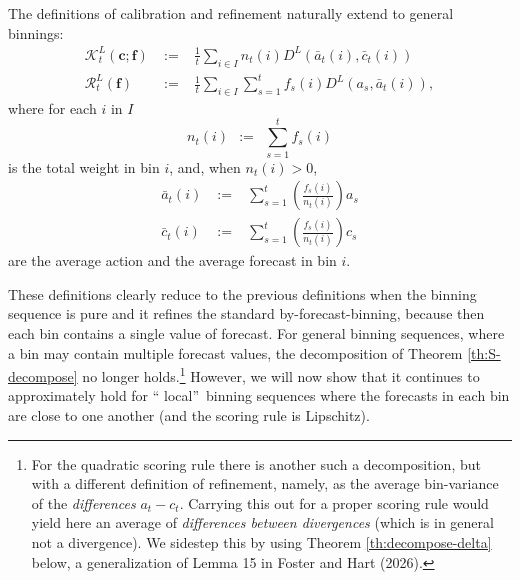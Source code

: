 \documentclass[12pt,a4paper,notitlepage]{article}
\begin{document}
The definitions of calibration and refinement naturally extend to general
binnings:%
\begin{eqnarray*}
\mathcal{K}_{t}^{L}(\mathbf{c};\mathbf{f}) &%
{\;:=\;}%
&\frac{1}{t}\sum_{i\in I}n_{t}(i)D^{L}(\bar{a}_{t}(i),\bar{c}_{t}(i)) \\
\mathcal{R}_{t}^{L}(\mathbf{f}) &%
{\;:=\;}%
&\frac{1}{t}\sum_{i\in I}\sum_{s=1}^{t}f_{s}(i)D^{L}(a_{s},\bar{a}_{t}(i)),
\end{eqnarray*}%
where for each $i$ in $I$%
\begin{equation*}
n_{t}(i)\,%
{\;:=\;}%
\,\sum_{s=1}^{t}f_{s}(i)
\end{equation*}%
is the total weight in bin $i$, and, when $n_{t}(i)>0$,%
\begin{eqnarray*}
\bar{a}_{t}(i) &%
{\;:=\;}%
&\sum_{s=1}^{t}\left( \frac{f_{s}(i)}{n_{t}(i)}\right) a_{s} \\
\bar{c}_{t}(i) &%
{\;:=\;}%
&\sum_{s=1}^{t}\left( \frac{f_{s}(i)}{n_{t}(i)}\right) c_{s}
\end{eqnarray*}%
are the average action and the average forecast in bin $i$.

These definitions clearly reduce to the previous definitions when the
binning sequence is pure and it refines the standard by-forecast-binning,
because then each bin contains a single value of forecast. For general
binning sequences, where a bin may contain multiple forecast values, the
decomposition of Theorem \ref{th:S-decompose} no longer holds.\footnote{%
For the quadratic scoring rule there is another such a decomposition, but
with a different definition of refinement, namely, as the average
bin-variance of the \emph{differences} $a_{t}-c_{t}$. Carrying this out for
a proper scoring rule would yield here an average of \emph{differences
between divergences} (which is in general not a divergence). We sidestep
this by using Theorem \ref{th:decompose-delta} below, a generalization of
Lemma 15 in Foster and Hart (2026).} However, we will now show that it
continues to approximately hold for \textquotedblleft
local\textquotedblright\ binning sequences where the forecasts in each bin
are close to one another (and the scoring rule is Lipschitz).
\end{document}
